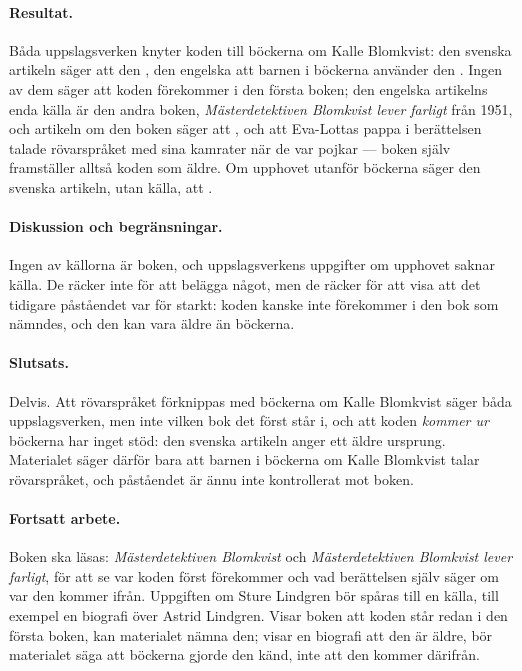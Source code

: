 \paragraph{Resultat.}  Båda uppslagsverken knyter koden till böckerna
om Kalle Blomkvist: den svenska artikeln säger att den
, den engelska att barnen i
böckerna använder den .  Ingen av dem säger att
koden förekommer i den första boken; den engelska artikelns enda källa
är den andra boken, \emph{Mästerdetektiven Blomkvist lever farligt} från
1951\autocite{WikipediaRovarspraketEn}, och artikeln om den boken säger
att , och att
Eva-Lottas pappa i berättelsen talade rövarspråket med sina kamrater när
de var pojkar --- boken själv framställer alltså koden som äldre.  Om
upphovet utanför böckerna säger den svenska artikeln, utan källa, att
.

\paragraph{Diskussion och begränsningar.}  Ingen av källorna är boken,
och uppslagsverkens uppgifter om upphovet saknar källa.  De räcker inte
för att belägga något, men de räcker för att visa att det tidigare
påståendet var för starkt: koden kanske inte förekommer i den bok som
nämndes, och den kan vara äldre än böckerna.

\paragraph{Slutsats.}  Delvis.  Att rövarspråket förknippas med
böckerna om Kalle Blomkvist säger båda uppslagsverken, men inte vilken
bok det först står i, och att koden \emph{kommer ur} böckerna har inget
stöd: den svenska artikeln anger ett äldre ursprung.  Materialet säger
därför bara att barnen i böckerna om Kalle Blomkvist talar rövarspråket,
och påståendet är ännu inte kontrollerat mot boken.

\paragraph{Fortsatt arbete.}  Boken ska läsas: \emph{Mästerdetektiven
Blomkvist} och \emph{Mästerdetektiven Blomkvist lever farligt}, för att
se var koden först förekommer och vad berättelsen själv säger om var den
kommer ifrån.  Uppgiften om Sture Lindgren bör spåras till en källa,
till exempel en biografi över Astrid Lindgren.  Visar boken att koden
står redan i den första boken, kan materialet nämna den; visar en
biografi att den är äldre, bör materialet säga att böckerna gjorde den
känd, inte att den kommer därifrån.



